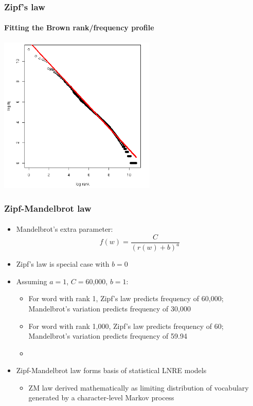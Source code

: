 \documentclass[t]{beamer} %
\begin{document}
\begin{frame}
  \frametitle{Zipf's law}
  \framesubtitle{Fitting the Brown rank/frequency profile}

  \ungap[1.5]
  \begin{center}
    \includegraphics[height=7.5cm]{img/brown-zipf-rf}
  \end{center}
\end{frame}

\begin{frame}
  \frametitle{Zipf-Mandelbrot law}
  \framesubtitle{\citet{Mandelbrot:53,Mandelbrot:62}}

  \begin{itemize}
    \item Mandelbrot's extra parameter:
    \[
    f(w)=\frac{C}{(r(w) + b)^a}
    \]
  \item Zipf's law is special case with $b=0$
  \item Assuming $a=1$, $C=$60,000, $b=1$:
    \begin{itemize}
    \item For word with rank 1, Zipf's law predicts frequency of
      60,000; Mandelbrot's variation predicts frequency of 30,000
    \item For word with rank 1,000,  Zipf's law predicts frequency of
      60; Mandelbrot's variation predicts frequency of 59.94
    \item[]
    \end{itemize}
  \item Zipf-Mandelbrot law forms basis of statistical LNRE models%
    \begin{itemize}
    \item ZM law derived mathematically as limiting distribution of
      vocabulary generated by a character-level Markov process
    \end{itemize}
  \end{itemize}
\end{frame}
\end{document}
